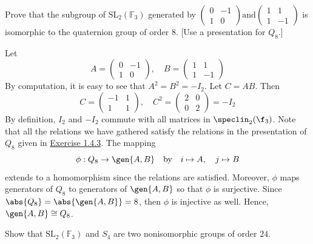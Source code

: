 \begin{exercise} \label{ex2.4.10}
    Prove that the subgroup of $\mathrm{SL}_2(\mathbb{F}_3)$ generated by $
    \begin{pmatrix}
        0 & -1 \\ 
        1 & 0 
    \end{pmatrix} \text{and}
    \begin{pmatrix}
        1 & 1 \\ 
        1 & -1 
    \end{pmatrix}$
    is isomorphic to the quaternion group of order $8$. [Use a presentation for $Q_8$.]
\end{exercise}

\begin{sol}
    Let
    \[A = 
    \begin{pmatrix}
        0 & -1 \\
        1 & 0
    \end{pmatrix}, \quad B = 
    \begin{pmatrix}
        1 & 1 \\
        1 & -1
    \end{pmatrix}\]
    By computation, it is easy to see that $A^2 = B^2 = -I_2$. Let $C = AB$. Then
    \[C =
    \begin{pmatrix}
        -1 & 1 \\
        1 & 1
    \end{pmatrix}, \quad C^2 =
    \begin{pmatrix}
        2 & 0 \\
        0 & 2
    \end{pmatrix} = -I_2\]
    By definition, $I_2$ and $-I_2$ commute with all matrices in $\speclin_2(\f_3)$. Note that all the relations we have gathered satisfy the relations in the presentation of $Q_8$ given in \hyperref[ex1.4.3]{Exercise 1.4.3}. The mapping
    \[\phi : Q_8 \to \gen{A, B} \quad \text{by} \quad i \mapsto A, \quad j \mapsto B\]
    extends to a homomorphism since the relations are satisfied. Moreover, $\phi$ maps generators of $Q_8$ to generators of $\gen{A, B}$ so that $\phi$ is surjective. Since $\abs{Q_8} = \abs{\gen{A, B}} = 8$, then $\phi$ is injective as well. Hence, $\gen{A, B} \cong Q_8$.
\end{sol}

\begin{exercise}\label{ex2.4.11}
    Show that $\mathrm{SL}_2(\mathbb{F}_3)$ and $S_4$ are two nonisomorphic groups of order $24$.
\end{exercise}

